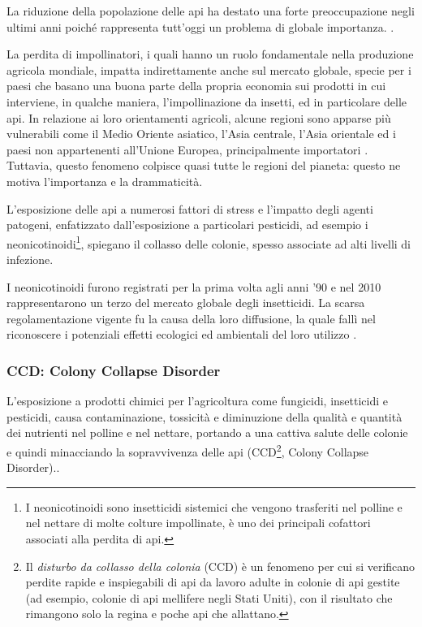 La riduzione della popolazione delle api ha destato una forte preoccupazione negli ultimi anni poiché rappresenta tutt'oggi un problema di globale importanza.
\cite{di_prisco_neonicotinoid_2013,li_neonicotinoid_2015}.

La perdita di impollinatori, i quali hanno un ruolo fondamentale nella produzione agricola mondiale, impatta indirettamente anche sul mercato globale, specie per i paesi che basano una buona parte della propria economia sui prodotti in cui interviene, in qualche maniera, l'impollinazione da insetti, ed in particolare delle api. In relazione ai loro orientamenti agricoli, alcune regioni sono apparse più vulnerabili come il Medio Oriente asiatico, l'Asia centrale, l'Asia orientale ed i paesi non appartenenti all'Unione Europea, principalmente importatori \cite{gallai_economic_2009}. Tuttavia, questo fenomeno colpisce quasi tutte le regioni del pianeta: questo ne motiva l'importanza e la drammaticità.

L'esposizione delle api a numerosi fattori di stress e l'impatto degli agenti patogeni, enfatizzato dall'esposizione a particolari pesticidi, ad esempio i neonicotinoidi\footnote{I neonicotinoidi sono insetticidi sistemici che vengono trasferiti nel polline e nel nettare di molte colture impollinate, è uno dei principali cofattori associati alla perdita di api.}, spiegano il collasso delle colonie, spesso associate ad alti livelli di infezione. 

I neonicotinoidi furono registrati per la prima volta agli anni '90 e nel 2010 rappresentarono un terzo del mercato globale degli insetticidi. La scarsa regolamentazione vigente fu la causa della loro diffusione, la quale fallì nel riconoscere i potenziali effetti ecologici ed ambientali del loro utilizzo \cite{sgolastra_bees_2020}. 

\subsubsection{CCD: Colony Collapse Disorder}

L'esposizione a prodotti chimici per l'agricoltura come fungicidi, insetticidi e pesticidi, causa contaminazione, tossicità e diminuzione della qualità e quantità dei nutrienti nel polline e nel nettare, portando a una cattiva salute delle colonie e quindi minacciando la sopravvivenza delle api (CCD\footnote{Il \textit{disturbo da collasso della colonia} (CCD) è un fenomeno per cui si verificano perdite rapide e inspiegabili di api da lavoro adulte in colonie di api gestite (ad esempio, colonie di api mellifere negli Stati Uniti), con il risultato che rimangono solo la regina e poche api che allattano.}, Colony Collapse Disorder).\cite{khalifa_overview_2021}.


